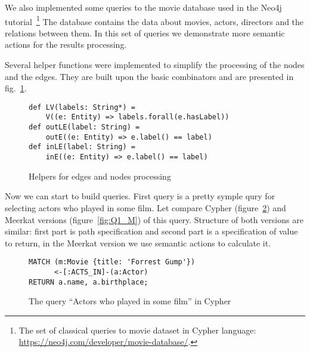 We also implemented some queries to the movie database used in the Neo4j tutorial~\footnote{The set of classical queries to movie dataset in Cypher language: \url{https://neo4j.com/developer/movie-database/}. }
The database contains the data about movies, actors, directors and the relations between them.
In this set of queries we demonstrate more semantic actions for the results processing. 


Several helper functions were implemented to simplify the processing of the nodes and the edges. 
They are built upon the basic combinators and are presented in fig.~\ref{fig:helpers}.


\begin{figure}[h]
\begin{lstlisting}
def LV(labels: String*) = 
    V((e: Entity) => labels.forall(e.hasLabel))
def outLE(label: String) = 
    outE((e: Entity) => e.label() == label)
def inLE(label: String) = 
    inE((e: Entity) => e.label() == label)
\end{lstlisting}
\caption{Helpers for edges and nodes processing}
\label{fig:helpers}
\end{figure}

Now we can start to build queries. 
First query is a pretty symple qury for selecting actors who played in some film.
Let compare Cypher (figure~\ref{fig:Q1_C}) and Meerkat versions (figure~\ref{fig:Q1_M}) of this query.
Structure of both versions are similar: first part is path specification and second part is a specification of value to return, in the Meerkat version we use semantic actions to calculate it.

\begin{figure}[h]
\begin{lstlisting}
MATCH (m:Movie {title: 'Forrest Gump'})
      <-[:ACTS_IN]-(a:Actor)
RETURN a.name, a.birthplace;
\end{lstlisting}
\caption{The query ``Actors who played in some film'' in Cypher}
\label{fig:Q1_C}
\end{figure}


